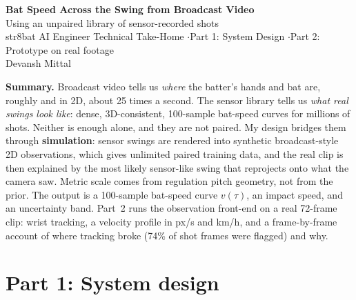 \documentclass[11pt,a4paper]{article}
\begin{document}

\begin{center}
{\LARGE\bfseries\color{ink} Bat Speed Across the Swing from Broadcast Video}\\[4pt]
{\large Using an unpaired library of sensor-recorded shots}\\[6pt]
{\small str8bat AI Engineer Technical Take-Home \quad$\cdot$\quad Part 1: System Design \quad$\cdot$\quad Part 2: Prototype on real footage}\\[2pt]
{\small Devansh Mittal}
\end{center}

\vspace{-2pt}
\noindent\colorbox{gray!8}{\parbox{\dimexpr\linewidth-2\fboxsep}{\small
\textbf{Summary.} Broadcast video tells us \emph{where} the batter's hands and bat are, roughly and in 2D, about 25 times a second.
The sensor library tells us \emph{what real swings look like}: dense, 3D-consistent, 100-sample bat-speed curves for millions of shots.
Neither is enough alone, and they are not paired. My design bridges them through \textbf{simulation}: sensor swings are rendered into synthetic
broadcast-style 2D observations, which gives unlimited paired training data, and the real clip is then explained by the most likely sensor-like swing
that reprojects onto what the camera saw. Metric scale comes from regulation pitch geometry, not from the prior.
The output is a 100-sample bat-speed curve $v(\tau)$, an impact speed, and an uncertainty band.
Part~2 runs the observation front-end on a real 72-frame clip: wrist tracking, a velocity profile in px/s and km/h,
and a frame-by-frame account of where tracking broke (74\% of shot frames were flagged) and why.}}

\section{Part 1: System design}
\end{document}
